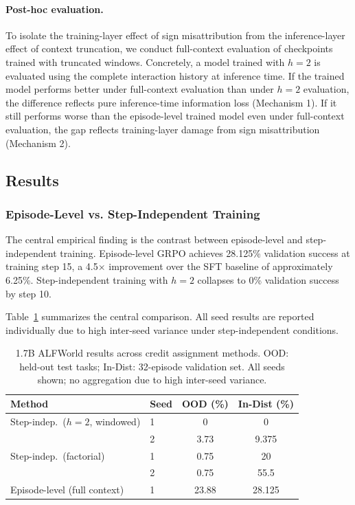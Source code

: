 \paragraph{Post-hoc evaluation.}
To isolate the training-layer effect of sign misattribution from the inference-layer effect of context truncation, we conduct full-context evaluation of checkpoints trained with truncated windows. Concretely, a model trained with $h = 2$ is evaluated using the complete interaction history at inference time. If the trained model performs better under full-context evaluation than under $h = 2$ evaluation, the difference reflects pure inference-time information loss (Mechanism 1). If it still performs worse than the episode-level trained model even under full-context evaluation, the gap reflects training-layer damage from sign misattribution (Mechanism 2).

\subsection{Results}
\label{sec:results}

\subsubsection{Episode-Level vs. Step-Independent Training}
\label{sec:results_main}

The central empirical finding is the contrast between episode-level and step-independent training. Episode-level GRPO achieves 28.125\% validation success at training step 15, a 4.5$\times$ improvement over the SFT baseline of approximately 6.25\%. Step-independent training with $h = 2$ collapses to 0\% validation success by step 10.

Table~\ref{tab:main_results} summarizes the central comparison. All seed results are reported individually due to high inter-seed variance under step-independent conditions.

\begin{table}[t]
\centering
\caption{1.7B ALFWorld results across credit assignment methods. OOD: held-out test tasks; In-Dist: 32-episode validation set. All seeds shown; no aggregation due to high inter-seed variance.}
\label{tab:main_results}
\small
\begin{tabular}{@{}llcc@{}}
\toprule
\textbf{Method} & \textbf{Seed} & \textbf{OOD (\%)} & \textbf{In-Dist (\%)} \\
\midrule
Step-indep.\ ($h{=}2$, windowed) & 1 & 0 & 0 \\  %
                                  & 2 & 3.73 & 9.375 \\  %
\midrule
Step-indep.\ (factorial)          & 1 & 0.75 & 20 \\  %
                                  & 2 & 0.75 & 55.5 \\  %
\midrule
Episode-level (full context)      & 1 & 23.88 & 28.125 \\  %
\bottomrule
\end{tabular}
\end{table}


